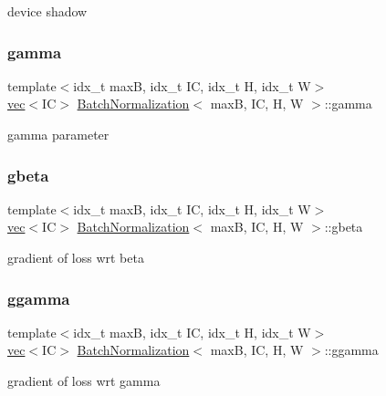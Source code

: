 device shadow \mbox{\label{structBatchNormalization_a19341c5df4950a9df17dc3ca2f2b9ecf}} 
\subsubsection{\texorpdfstring{gamma}{gamma}}
{\footnotesize\ttfamily template$<$idx\+\_\+t maxB, idx\+\_\+t IC, idx\+\_\+t H, idx\+\_\+t W$>$ \\
\hyperlink{structvec}{vec}$<$IC$>$ \hyperlink{structBatchNormalization}{Batch\+Normalization}$<$ maxB, IC, H, W $>$\+::gamma}

gamma parameter \mbox{\label{structBatchNormalization_a881e8679992c8e0fb22c2e208e55e93d}} 
\subsubsection{\texorpdfstring{gbeta}{gbeta}}
{\footnotesize\ttfamily template$<$idx\+\_\+t maxB, idx\+\_\+t IC, idx\+\_\+t H, idx\+\_\+t W$>$ \\
\hyperlink{structvec}{vec}$<$IC$>$ \hyperlink{structBatchNormalization}{Batch\+Normalization}$<$ maxB, IC, H, W $>$\+::gbeta}

gradient of loss wrt beta \mbox{\label{structBatchNormalization_a050a1a786d6b10b0c0359214cfdb4fef}} 
\subsubsection{\texorpdfstring{ggamma}{ggamma}}
{\footnotesize\ttfamily template$<$idx\+\_\+t maxB, idx\+\_\+t IC, idx\+\_\+t H, idx\+\_\+t W$>$ \\
\hyperlink{structvec}{vec}$<$IC$>$ \hyperlink{structBatchNormalization}{Batch\+Normalization}$<$ maxB, IC, H, W $>$\+::ggamma}

gradient of loss wrt gamma \mbox{\label{structBatchNormalization_a916260aac816d659d876988c94666791}} 
